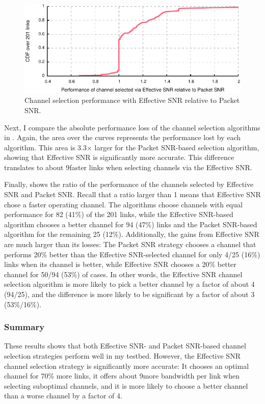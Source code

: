 \begin{figure}[p]
	\centering
	\includegraphics[width=\textwidth]{figures/applications/chan_sel_ratio.pdf}
	\caption[The relative throughput selecting channels by Effective SNR or Packet SNR]{\label{fig:chan_sel_ratio}Channel selection performance with Effective SNR relative to Packet SNR.}
\end{figure}

Next, I compare the absolute performance loss of the channel selection algorithms in . Again, the area over the curves represents the performance lost by each algorithm. This area is 3.3$\times$ larger for the Packet SNR-based selection algorithm, showing that Effective SNR is significantly more accurate. This difference translates to about 9\Mbps faster links when selecting channels via the Effective SNR.

Finally,  shows the ratio of the performance of the channels selected by Effective SNR and Packet SNR. Recall that a ratio larger than 1 means that Effective SNR chose a faster operating channel. The algorithms choose channels with equal performance for 82 (41\%) of the 201 links, while the Effective SNR-based algorithm chooses a better channel for 94 (47\%) links and the Packet SNR-based algorithm for the remaining 25 (12\%). Additionally, the gains from Effective SNR are much larger than its losses: The Packet SNR strategy chooses a channel that performs 20\% better than the Effective SNR-selected channel for only 4/25 (16\%) links when its channel is better, while Effective SNR chooses a 20\% better channel for 50/94 (53\%) of cases. In other words, the Effective SNR channel selection algorithm is more likely to pick a better channel by a factor of about 4 (94/25), and the difference is more likely to be significant by a factor of about 3 (53\%/16\%).

\subsubsection{Summary}
These results shows that both Effective SNR- and Packet SNR-based channel selection strategies perform well in my testbed. However, the Effective SNR channel selection strategy is significantly more accurate: It chooses an optimal channel for 70\% more links, it offers about 9\Mbps more bandwidth per link when selecting suboptimal channels, and it is more likely to choose a better channel than a worse channel by a factor of 4.

